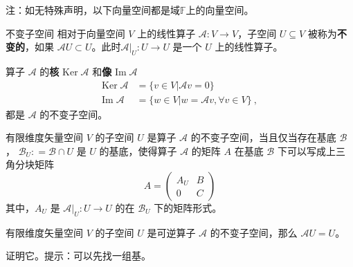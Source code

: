 


注：如无特殊声明，以下向量空间都是域$\mathbb{F}$上的向量空间。

\begin{definition}{不变子空间}
相对于向量空间 $V$ 上的线性算子 $\mathcal{A}: V \rightarrow V$，子空间 $U \subseteq V$ 被称为\textbf{不变的}，如果 $\mathcal{A} U \subset U$。此时$\mathcal{A}|_U: U \to U$ 是一个 $U$ 上的线性算子。
\end{definition}

\begin{example}{}
算子 $\mathcal{A}$ 的\textbf{核} $\mathrm{Ker}\;\mathcal A$ 和\textbf{像} $\mathrm{Im}\;\mathcal{A}$
\begin{equation}\label{InvSP_eq3}
\begin{aligned}
\mathrm{Ker}\;\mathcal{A}&=\{ v\in V|\mathcal{A} v= 0\}\\
\mathrm{Im}\;\mathcal{A}&=\{ w\in V| w=\mathcal{A} v,\forall v\in V\}~,
\end{aligned}
\end{equation}
都是 $\mathcal A$ 的不变子空间。
\end{example}

\begin{theorem}{}
有限维度矢量空间 $V$ 的子空间 $U$ 是算子 $\mathcal{A}$ 的不变子空间，当且仅当存在基底 $\mathcal{B}$， $\mathcal{B}_U: = \mathcal{B} \cap U$ 是 $U$ 的基底，使得算子 $\mathcal{A}$ 的矩阵 $A$ 在基底 $\mathcal{B}$ 下可以写成上三角分块矩阵
\begin{equation}
A = \begin{pmatrix}
A_U & B\\
0 & C
\end{pmatrix}
\end{equation}
其中，$A_U$ 是 $\mathcal{A}|_{U}: U \to U$ 的在 $\mathcal{B}_U$ 下的矩阵形式。
\end{theorem}

\begin{theorem}{}
有限维度矢量空间 $V$ 的子空间 $U$ 是可逆算子 $\mathcal{A}$ 的不变子空间，那么 $\mathcal{A} U = U$。
\end{theorem}
\begin{exercise}{}
证明它。提示：可以先找一组基。
\end{exercise}

